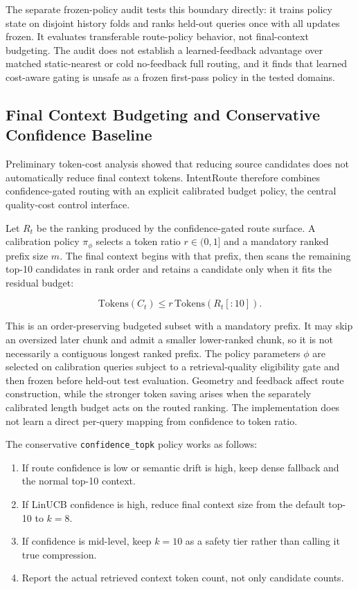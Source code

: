 The separate frozen-policy audit tests this boundary directly: it trains policy state on disjoint history folds and ranks held-out queries once with all updates frozen. It evaluates transferable route-policy behavior, not final-context budgeting. The audit does not establish a learned-feedback advantage over matched static-nearest or cold no-feedback full routing, and it finds that learned cost-aware gating is unsafe as a frozen first-pass policy in the tested domains.

\subsection{Final Context Budgeting and Conservative Confidence Baseline}
\label{sec:04-method:final-context-budgeting-and-conservative-confidence-baseline}

Preliminary token-cost analysis showed that reducing source candidates does not automatically reduce final context tokens. IntentRoute therefore combines confidence-gated routing with an explicit calibrated budget policy, the central quality-cost control interface.

Let $R_t$ be the ranking produced by the confidence-gated route surface. A calibration policy $\pi_\phi$ selects a token ratio $r \in (0,1]$ and a mandatory ranked prefix size $m$. The final context begins with that prefix, then scans the remaining top-10 candidates in rank order and retains a candidate only when it fits the residual budget:

\[
\mathrm{Tokens}(C_t) \le r\,\mathrm{Tokens}(R_t[:10]).
\]

This is an order-preserving budgeted subset with a mandatory prefix. It may skip an oversized later chunk and admit a smaller lower-ranked chunk, so it is not necessarily a contiguous longest ranked prefix. The policy parameters $\phi$ are selected on calibration queries subject to a retrieval-quality eligibility gate and then frozen before held-out test evaluation. Geometry and feedback affect route construction, while the stronger token saving arises when the separately calibrated length budget acts on the routed ranking. The implementation does not learn a direct per-query mapping from confidence to token ratio.

The conservative \nolinkurl{confidence_topk} policy works as follows:

\begin{enumerate}
\item If route confidence is low or semantic drift is high, keep dense fallback and the normal top-10 context.
\item If LinUCB confidence is high, reduce final context size from the default top-10 to $k=8$.
\item If confidence is mid-level, keep $k=10$ as a safety tier rather than calling it true compression.
\item Report the actual retrieved context token count, not only candidate counts.
\end{enumerate}

